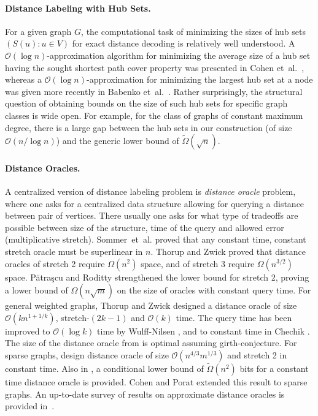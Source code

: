 \documentclass{article}[11pt,letter]
\newcommand{\bigo}{\mathcal{O}}
\newcommand{\etal}{{et~al.}\xspace}
\begin{document}
\paragraph{Distance Labeling with Hub Sets.} For a given graph $G$, the computational task of minimizing the sizes of hub sets $(S(u) : u\in V)$ for exact distance decoding is relatively well understood. A $\bigo(\log n)$-approximation algorithm for minimizing the average size of a hub set having the sought shortest path cover property was presented in Cohen \etal~\cite{Cohen:2003:RDQ:942270.944300}, whereas a $\bigo(\log n)$-approximation for minimizing the largest hub set at a node was given more recently in Babenko \etal~\cite{DBLP:conf/icalp/BabenkoGGN13}. Rather surprisingly, the structural question of obtaining bounds on the size of such hub sets for specific graph classes is wide open. For example, for the class of graphs of constant maximum degree, there is a large gap between the hub sets in our construction (of size $\bigo(n/\log n)$) and the generic lower bound of $\widetilde \Omega(\sqrt n)$.





\paragraph{Distance Oracles.}

A centralized version of distance labeling problem is \emph{distance oracle} problem, where one asks for a centralized data structure allowing for querying a distance between pair of vertices. There usually one asks for what type of tradeoffs are possible between size of the structure, time of the query and allowed error (multiplicative stretch). Sommer~\etal \cite{sommer2009distance} proved that any constant time, constant stretch oracle must be superlinear in $n$. Thorup and Zwick \cite{Thorup:2001:CRS:378580.378581} proved that distance oracles of stretch 2 require $\Omega(n^2)$ space, and of stretch 3 require $\Omega(n^{3/2})$ space. Pătraşcu and Roditty \cite{PatrascuR14} strengthened the lower bound for stretch 2, proving a lower bound of $\Omega(n\sqrt{m})$ on the size of oracles with constant query time. For general weighted graphs, Thorup and Zwick \cite{Thorup:2001:CRS:378580.378581} designed a distance oracle of size $\bigo(kn^{1+1/k})$, stretch-$(2k-1)$ and $\bigo(k)$ time. The query time has been improved to $\bigo(\log k)$ time by Wulff-Nilsen \cite{doi:10.1137/1.9781611973105.39}, and to constant time in Chechik \cite{Chechik:2014:ADO:2591796.2591801}. The size of the distance oracle from \cite{Thorup:2001:CRS:378580.378581} is optimal assuming girth-conjecture. For sparse graphs, \cite{PatrascuR14} design distance oracle of size $\bigo(n^{4/3}m^{1/3})$ and stretch 2 in constant time. Also in \cite{PatrascuR14}, a conditional lower bound of $\widetilde\Omega(n^2)$ bits for a constant time distance oracle is provided. Cohen and Porat \cite{DBLP:journals/corr/abs-1006-1117} extended this result to sparse graphs.  An up-to-date survey of results on approximate distance oracles is provided in~\cite{DBLP:reference/algo/Roditty15a}.
\end{document}
